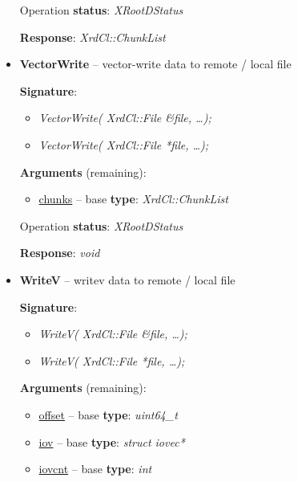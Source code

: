 \documentclass{article}
\begin{document}
\begin{itemize}
\begin{samepage}
                    Operation \textbf{status}: \textit{XRootDStatus}

                    \textbf{Response}: \textit{XrdCl::ChunkList}
					
                \end{samepage}

                \item \begin{samepage} \textbf{VectorWrite} -- vector-write data to remote / local file

                    \textbf{Signature}:
                    \begin{itemize} 
                        \item \textit{VectorWrite( XrdCl::File \&file, \ldots);}
                        \item \textit{VectorWrite( XrdCl::File *file, \ldots );}
                    \end{itemize}

                    \textbf{Arguments} (remaining):
                    \begin{itemize}
                        \item \underline{chunks} -- base \textbf{type}: \textit{XrdCl::ChunkList}
                    \end{itemize}

                    Operation \textbf{status}: \textit{XRootDStatus}

                    \textbf{Response}: \textit{void}

                \end{samepage}

                \item \begin{samepage} \textbf{WriteV} -- writev data to remote / local file

                    \textbf{Signature}:
                    \begin{itemize} 
                        \item \textit{WriteV( XrdCl::File \&file, \ldots);}
                        \item \textit{WriteV( XrdCl::File *file, \ldots );}
                    \end{itemize}

                    \textbf{Arguments} (remaining):
                    \begin{itemize}
                        \item \underline{offset} -- base \textbf{type}: \textit{uint64_t}
                        \item \underline{iov} -- base \textbf{type}: \textit{struct iovec*}
                        \item \underline{iovcnt} -- base \textbf{type}: \textit{int}
                    \end{itemize}


\end{samepage}
\end{itemize}
\end{document}
